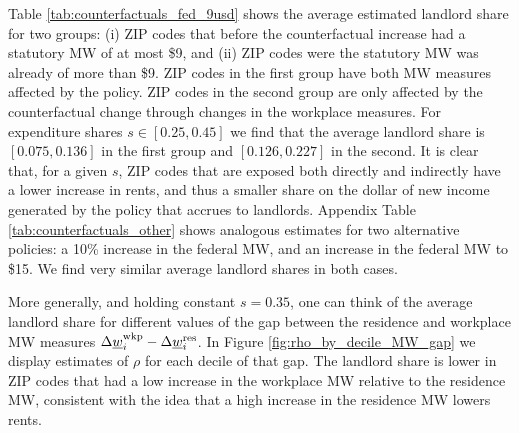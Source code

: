 Table \ref{tab:counterfactuals_fed_9usd} shows the average estimated landlord 
share for two groups: 
(i) ZIP codes that before the counterfactual increase had a statutory MW of 
at most \$9, and 
(ii) ZIP codes were the statutory MW was already of more than \$9.
ZIP codes in the first group have both MW measures affected by the policy.
ZIP codes in the second group are only affected by the counterfactual change 
through changes in the workplace measures.
For expenditure shares $s\in[0.25, 0.45]$ we find that the average landlord
share is $[0.075, 0.136]$ in the first group and $[0.126, 0.227]$ in the 
second.
It is clear that, for a given $s$, ZIP codes that are exposed both directly
and indirectly have a lower increase in rents, and thus a smaller share
on the dollar of new income generated by the policy that accrues to landlords.
Appendix Table \ref{tab:counterfactuals_other} shows analogous estimates for
two alternative policies: a 10\% increase in the federal MW, and an increase
in the federal MW to \$15.
We find very similar average landlord shares in both cases.

More generally, and holding constant $s=0.35$, one can think of the average 
landlord share for different values of the gap between the residence and 
workplace MW measures 
$\Delta \underline{w}_i^{\text{wkp}} - \Delta \underline{w}_i^{\text{res}}$.
In Figure \ref{fig:rho_by_decile_MW_gap} we display estimates of $\rho$ for 
each decile of that gap.
The landlord share is lower in ZIP codes that had a low increase in the 
workplace MW relative to the residence MW, consistent with the idea
that a high increase in the residence MW lowers rents.
